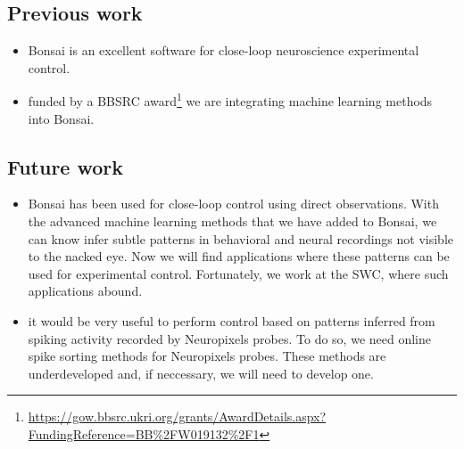 \subsection{Previous work}

\begin{itemize}

    \item Bonsai is an excellent software for close-loop
        neuroscience experimental control.

    \item funded by a BBSRC
        award\footnote{\url{https://gow.bbsrc.ukri.org/grants/AwardDetails.aspx?FundingReference=BB\%2FW019132\%2F1}}
        we are integrating machine learning methods into Bonsai.

\end{itemize}

\subsection{Future work}

\begin{itemize}

    \item Bonsai has been used for close-loop control using direct
        observations. With the advanced machine learning methods that we have
        added to Bonsai, we can know infer subtle patterns in behavioral and
        neural recordings not visible to the nacked eye. Now we will find
        applications where these patterns can be used for experimental control.
        Fortunately, we work at the SWC, where such applications abound.

    \item it would be very useful to perform control based on patterns inferred
        from spiking activity recorded by Neuropixels probes. To do so, we need
        online spike sorting methods for Neuropixels probes. These methods are
        underdeveloped and, if neccessary, we will need to develop one.

\end{itemize}
